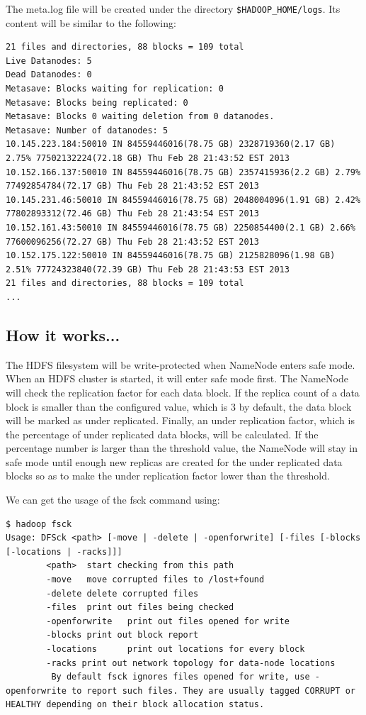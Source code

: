 The meta.log file will be created under the directory \verb|$HADOOP_HOME/logs|. Its content will be similar to the following:
\begin{verbatim}
21 files and directories, 88 blocks = 109 total
Live Datanodes: 5
Dead Datanodes: 0
Metasave: Blocks waiting for replication: 0
Metasave: Blocks being replicated: 0
Metasave: Blocks 0 waiting deletion from 0 datanodes.
Metasave: Number of datanodes: 5
10.145.223.184:50010 IN 84559446016(78.75 GB) 2328719360(2.17 GB) 2.75% 77502132224(72.18 GB) Thu Feb 28 21:43:52 EST 2013
10.152.166.137:50010 IN 84559446016(78.75 GB) 2357415936(2.2 GB) 2.79% 77492854784(72.17 GB) Thu Feb 28 21:43:52 EST 2013
10.145.231.46:50010 IN 84559446016(78.75 GB) 2048004096(1.91 GB) 2.42% 77802893312(72.46 GB) Thu Feb 28 21:43:54 EST 2013
10.152.161.43:50010 IN 84559446016(78.75 GB) 2250854400(2.1 GB) 2.66% 77600096256(72.27 GB) Thu Feb 28 21:43:52 EST 2013
10.152.175.122:50010 IN 84559446016(78.75 GB) 2125828096(1.98 GB) 2.51% 77724323840(72.39 GB) Thu Feb 28 21:43:53 EST 2013
21 files and directories, 88 blocks = 109 total
...
\end{verbatim}

\subsection*{How it works...}
The HDFS filesystem will be write-protected when NameNode enters safe mode. When an HDFS cluster is started, it will enter safe mode first. The NameNode will check the replication factor for each data block. If the replica count of a data block is smaller than the configured value, which is 3 by default, the data block will be marked as under replicated. Finally, an under replication factor, which is the percentage of under replicated data blocks, will be calculated. If the percentage number is larger than the threshold value, the NameNode will stay in safe mode until enough new replicas are created for the under replicated data blocks so as to make the under replication factor lower than the threshold.

We can get the usage of the fsck command using:
\begin{verbatim}
$ hadoop fsck
Usage: DFSck <path> [-move | -delete | -openforwrite] [-files [-blocks [-locations | -racks]]]
        <path>  start checking from this path
        -move   move corrupted files to /lost+found
        -delete delete corrupted files
        -files  print out files being checked
        -openforwrite   print out files opened for write
        -blocks print out block report
        -locations      print out locations for every block
        -racks print out network topology for data-node locations
         By default fsck ignores files opened for write, use -openforwrite to report such files. They are usually tagged CORRUPT or HEALTHY depending on their block allocation status.
\end{verbatim}

